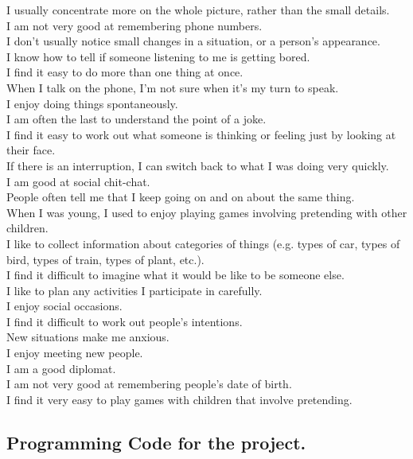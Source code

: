 \documentclass[a4paper, 11pt]{article}
\begin{document}
I usually concentrate more on the whole picture, rather than the small details.\\
I am not very good at remembering phone numbers.\\
I don't usually notice small changes in a situation, or a person's appearance.\\
I know how to tell if someone listening to me is getting bored.\\
I find it easy to do more than one thing at once.\\
When I talk on the phone, I'm not sure when it's my turn to speak.\\
I enjoy doing things spontaneously.\\
I am often the last to understand the point of a joke.\\
I find it easy to work out what someone is thinking or feeling just by looking at their face.\\
If there is an interruption, I can switch back to what I was doing very quickly. \\
I am good at social chit-chat.\\
People often tell me that I keep going on and on about the same thing.\\
When I was young, I used to enjoy playing games involving pretending with other children.\\
I like to collect information about categories of things (e.g. types of car, types of bird, types of train, types of plant, etc.).\\
I find it difficult to imagine what it would be like to be someone else.\\
I like to plan any activities I participate in carefully.\\
I enjoy social occasions.\\
I find it difficult to work out people's intentions.\\
New situations make me anxious.\\
I enjoy meeting new people.\\
I am a good diplomat.\\
I am not very good at remembering people's date of birth.\\
I find it very easy to play games with children that involve pretending.\\

\newpage
\subsection{Programming Code for the project.}
\end{document}
